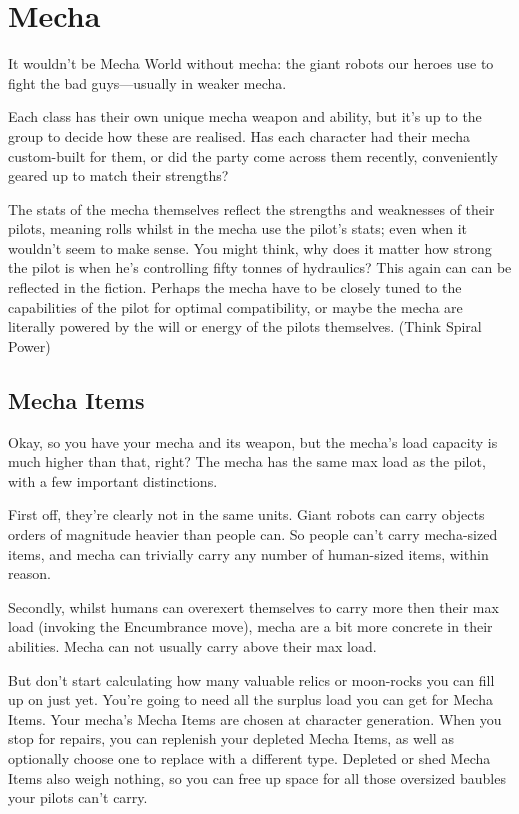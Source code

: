 \section{Mecha}

It wouldn't be Mecha World without mecha: the giant robots our heroes use to fight the bad guys---usually in weaker mecha.

Each class has their own unique mecha weapon and ability, but it's up to the group to decide how these are realised. Has each character had their mecha custom-built for them, or did the party come across them recently, conveniently geared up to match their strengths?

The stats of the mecha themselves reflect the strengths and weaknesses of their pilots, meaning rolls whilst in the mecha use the pilot's stats; even when it wouldn't seem to make sense. You might think, why does it matter how strong the pilot is when he's controlling fifty tonnes of hydraulics? This again can can be reflected in the fiction. Perhaps the mecha have to be closely tuned to the capabilities of the pilot for optimal compatibility, or maybe the mecha are literally powered by the will or energy of the pilots themselves. (Think Spiral Power)


\subsection{Mecha Items}
Okay, so you have your mecha and its weapon, but the mecha's load capacity is much higher than that, right? The mecha has the same max load as the pilot, with a few important distinctions.

First off, they're clearly not in the same units. Giant robots can carry objects orders of magnitude heavier than people can. So people can't carry mecha-sized items, and mecha can trivially carry any number of human-sized items, within reason.

Secondly, whilst humans can overexert themselves to carry more then their max load (invoking the Encumbrance move), mecha are a bit more concrete in their abilities. Mecha can not usually carry above their max load.

But don't start calculating how many valuable relics or moon-rocks you can fill up on just yet. You're going to need all the surplus load you can get for Mecha Items. Your mecha's Mecha Items are chosen at character generation. When you stop for repairs, you can replenish your depleted Mecha Items, as well as optionally choose one to replace with a different type. Depleted or shed Mecha Items also weigh nothing, so you can free up space for all those oversized baubles your pilots can't carry.

